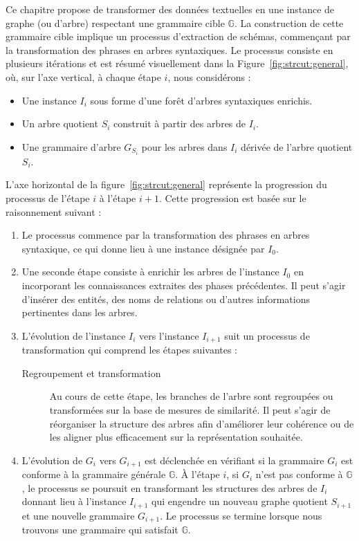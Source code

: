 Ce chapitre propose de transformer des données textuelles en une instance de graphe (ou d'arbre) respectant une grammaire cible $\mathbb{G}$.
La construction de cette grammaire cible implique un processus d'extraction de schémas, commençant par la transformation des phrases en arbres syntaxiques.
Le processus consiste en plusieurs itérations et est résumé visuellement dans la Figure~\ref{fig:strcut:general}, où, sur l'axe vertical, à chaque étape $i$, nous considérons :
\begin{itemize}
    \item Une instance $I_i$ sous forme d'une forêt d'arbres syntaxiques enrichis.
    \item Un arbre quotient $S_i$ construit à partir des arbres de $I_i$.
    \item Une grammaire d'arbre $G_{S_i}$ pour les arbres dans $I_i$ dérivée de l'arbre quotient $S_i$.
\end{itemize}

L'axe horizontal de la figure~\ref{fig:strcut:general} représente la progression du processus de l'étape $i$ à l'étape $i+1$. Cette progression est basée sur le raisonnement suivant :
\begin{enumerate}
    \item Le processus commence par la transformation des phrases en arbres syntaxique, ce qui donne lieu à une instance désignée par $I_0$.
    
    \item Une seconde étape consiste à enrichir les arbres de l'instance $I_0$ en incorporant les connaissances extraites des phases précédentes. Il peut s'agir d'insérer des entités, des noms de relations ou d'autres informations pertinentes dans les arbres.

    \item L'évolution de l'instance $I_i$ vers l'instance $I_{i+1}$ suit un processus de transformation qui comprend les étapes suivantes :
    \begin{description}
        \item[Regroupement et transformation] Au cours de cette étape, les branches de l'arbre sont regroupées ou transformées sur la base de mesures de similarité. Il peut s'agir de réorganiser la structure des arbres afin d'améliorer leur cohérence ou de les aligner plus efficacement sur la représentation souhaitée.
    \end{description}

    \item L'évolution de $G_i$ vers $G_{i+1}$ est déclenchée en vérifiant si la grammaire $G_i$ est conforme à la grammaire générale $\mathbb{G}$.
    À l'étape $i$, si $G_i$ n'est pas conforme à $\mathbb{G}$, le processus se poursuit en transformant les structures des arbres de $I_i$ donnant lieu à l'instance $I_{i+1}$ qui engendre un nouveau graphe quotient $S_{i+1}$ et une nouvelle grammaire $G_{i+1}$.
    Le processus se termine lorsque nous trouvons une grammaire qui satisfait $\mathbb{G}$.
\end{enumerate}

